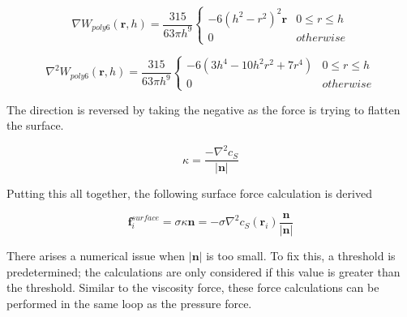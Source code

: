 \documentclass[a4paper, 12pt]{article}
\begin{document}
    \begin{equation}
        \nabla W_{poly6}(\textbf{r}, h) = \frac{315}{63\pi{h}^9}
        \begin{cases}
            -6(h^2-r^2)^2\textbf{r} & 0 \leq r \leq h \\
            0 & otherwise
        \end{cases}
    \end{equation}

    \begin{equation}
        \nabla^2 W_{poly6}(\textbf{r}, h) = \frac{315}{63\pi{h}^9}
        \begin{cases}
            -6(3h^4 - 10h^2r^2 + 7r^4) & 0 \leq r \leq h \\
            0 & otherwise
        \end{cases}
    \end{equation}
    
    The direction is reversed by taking the negative as the force is trying to flatten the surface.

    \begin{equation}
        \kappa = \frac{-\nabla^2 c_S}{\left|\textbf{n}\right|}
    \end{equation}

    Putting this all together, the following surface force calculation is derived

    \begin{equation}
        \textbf{f}^{surface}_{i} = \sigma \kappa \textbf{n} = -\sigma \nabla^2 c_S(\textbf{r}_i)\frac{\textbf{n}}{\left|\textbf{n}\right|}
    \end{equation}

    There arises a numerical issue when $\left|\textbf{n}\right|$ is too small. To fix this, a threshold is predetermined; the calculations are only considered if this value is greater than the threshold. Similar to the viscosity force, these force calculations can be performed in the same loop as the pressure force.
\end{document}
